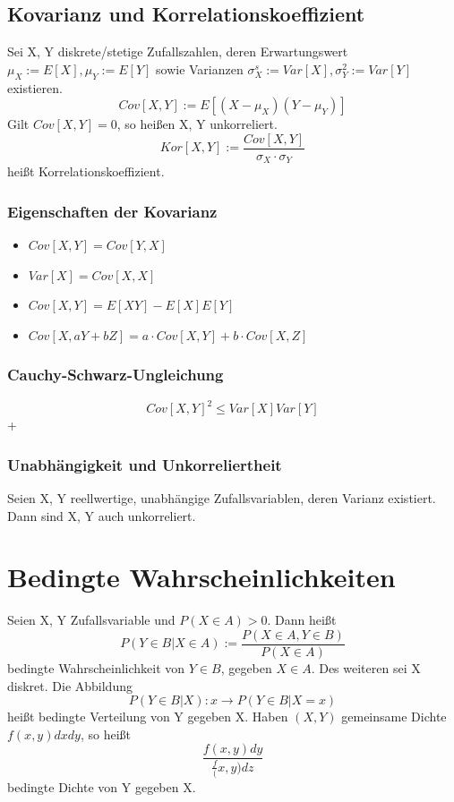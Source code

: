 \documentclass{report}
\begin{document}
\section*{Kovarianz und Korrelationskoeffizient}
Sei X, Y diskrete/stetige Zufallszahlen, deren Erwartungswert $\mu_X := E[X], \mu_Y := E[Y]$ sowie Varianzen $\sigma^s_X := Var[X], \sigma^2_Y := Var[Y]$ existieren.
\[Cov[X, Y] := E[(X-\mu_X)(Y-\mu_Y)]\]
Gilt $Cov[X, Y] = 0$, so heißen X, Y unkorreliert.
\[Kor[X, Y] := \frac{Cov[X, Y]}{\sigma_X \cdot \sigma_Y}\] heißt Korrelationskoeffizient.
\subsection*{Eigenschaften der Kovarianz}
\begin{itemize}
    \item $Cov[X, Y] = Cov[Y, X]$
    \item $Var[X] = Cov[X, X]$
    \item $Cov[X, Y] = E[XY] - E[X]E[Y]$
    \item $Cov[X, aY+bZ] = a \cdot Cov[X, Y] + b \cdot Cov[X, Z]$
\end{itemize}
\subsection*{Cauchy-Schwarz-Ungleichung}
\[Cov[X, Y]^2 \leq Var[X]Var[Y]\]+
\subsection*{Unabhängigkeit und Unkorreliertheit}
Seien X, Y reellwertige, unabhängige Zufallsvariablen, deren Varianz existiert. Dann sind X, Y auch unkorreliert.
\chapter*{Bedingte Wahrscheinlichkeiten}
Seien X, Y Zufallsvariable und $P(X \in A) > 0$. Dann heißt \[P(Y \in B|X \in A):= \frac{P(X \in A, Y \in B)}{P(X \in A)}\] bedingte Wahrscheinlichkeit von ${Y \in B}$, gegeben ${X \in A}$. Des weiteren sei X diskret. Die Abbildung \[P(Y \in B | X) : x \rightarrow P(Y \in B | X = x)\] heißt bedingte Verteilung von Y gegeben X. Haben $(X, Y )$ gemeinsame Dichte $f (x, y)dxdy$, so heißt \[\frac{f(x, y)dy}{\frac f(x, y)dz}\] bedingte Dichte von Y gegeben X.
\end{document}

